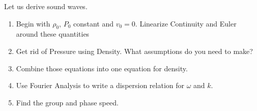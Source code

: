 Let us derive sound waves.
\begin{enumerate}
\item {} Begin with $\rho_0$, $P_0$ constant and $v_0=0$.  Linearize
Continuity and Euler around these quantities
\item {} Get rid of Pressure using Density.  What assumptions do you need
to make?
\item {} Combine those equations into one equation for density.
\item {} Use Fourier Analysis to write a dispersion relation for $\omega$
and $k$.
\item {} Find the group and phase speed.
\end{enumerate}
